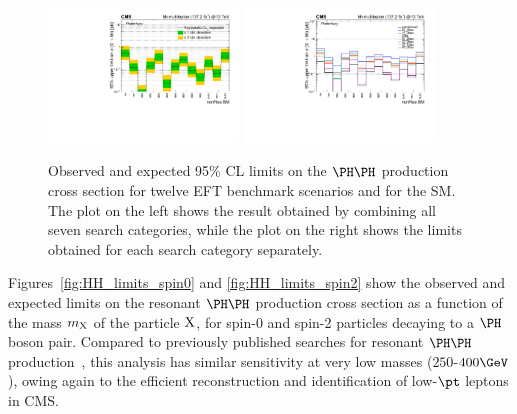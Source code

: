 \begin{figure}
  \centering
  \includegraphics[width=0.45\textwidth]{figures/bmScan_multilepton_RUN2.pdf}
  \hspace{0.05\textwidth}
  \includegraphics[width=0.45\textwidth]{figures/multiBMScan_multilepton_Run2.pdf}
  \caption{
    Observed and expected 95\% CL limits on the $\HH$ production cross section for
    twelve EFT benchmark scenarios and for the SM.
    The plot on the left shows the result obtained by combining all seven search categories,
    while the plot on the right shows the limits obtained for each search category separately. 
  }
  \label{fig:HH_limits_EFT}
\end{figure}

Figures~\ref{fig:HH_limits_spin0} and \ref{fig:HH_limits_spin2} show the observed and
expected limits on the resonant $\HH$ production cross section as a function of the mass $m_{\textrm{X}}$ of the particle $\textrm{X}$,
for spin-0 and spin-2 particles decaying to a $\PHiggs$ boson pair.
Compared to previously published searches for resonant $\HH$
production~\cite{Sirunyan:2018ayu,2020135103},
this analysis has similar sensitivity at very low masses ($250$-$400\GeV$),
owing again to the efficient reconstruction and identification of low-$\pt$ leptons in CMS.

